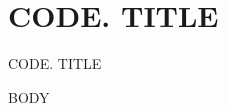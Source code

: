 \section[{{CODE}}]{ {{CODE}}. {{TITLE}} }
\begin{frame}{ {{CODE}}. {{TITLE}} }
\end{frame}
{{BODY}}
